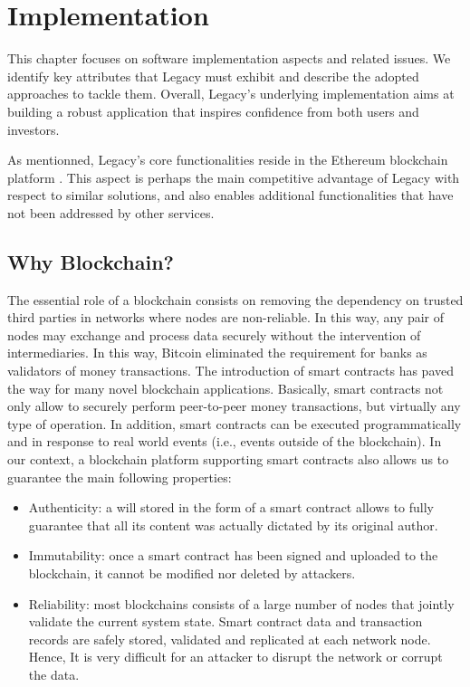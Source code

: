 \chapter{Implementation} %
\label{cha:implementation}

This chapter focuses on software implementation aspects and related issues. We identify key attributes that Legacy must exhibit and describe the adopted approaches to tackle them. Overall, Legacy’s underlying implementation aims at building a robust application that inspires confidence from both users and investors.

As mentionned, Legacy’s core functionalities reside in the Ethereum blockchain platform \cite{Ethereum}. This aspect is perhaps the main competitive advantage of Legacy with respect to similar solutions, and also enables additional functionalities that have not been addressed by other services. 

\section{Why Blockchain?} %
\label{sec:why_blockchain_}

The essential role of a blockchain consists on removing the dependency on trusted third parties in networks where nodes are non-reliable. In this way, any pair of nodes may exchange and process data securely without the intervention of intermediaries. In this way, Bitcoin eliminated the requirement for banks as validators of money transactions. The introduction of smart contracts has paved the way for many novel blockchain applications. Basically, smart contracts not only allow to securely perform peer-to-peer money transactions, but virtually any type of operation. In addition, smart contracts can be executed programmatically and in response to real world events (i.e., events outside of the blockchain). In our context, a blockchain platform supporting smart contracts also allows us to guarantee the main following properties: 

\begin{itemize}
	\item Authenticity: a will stored in the form of a smart contract allows to fully guarantee that all its content was actually dictated by its original author.
	\item Immutability: once a smart contract has been signed and uploaded to the blockchain, it cannot be modified nor deleted by attackers.
	\item Reliability: most blockchains consists of a large number of nodes that jointly validate the current system state. Smart contract data and transaction records are safely stored, validated and replicated at each network node. Hence, It is very difficult for an attacker to disrupt the network or corrupt the data.
\end{itemize}

